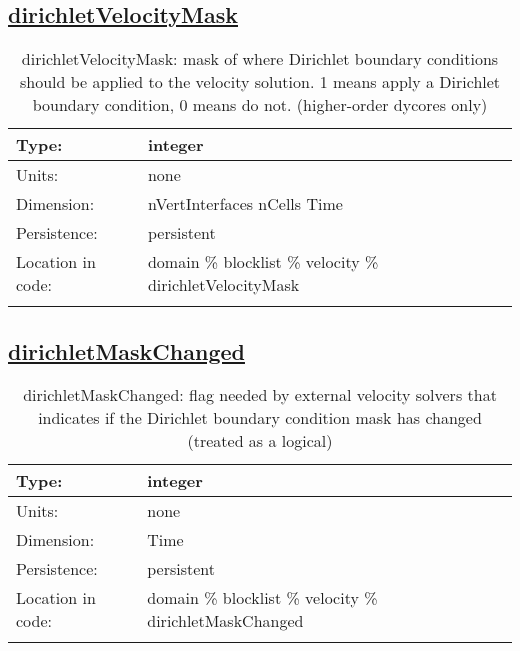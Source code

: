 \subsection[dirichletVelocityMask]{\hyperref[sec:var_tab_velocity]{dirichletVelocityMask}}
\label{subsec:var_sec_velocity_dirichletVelocityMask}
\begin{center}
\begin{longtable}{| p{2.0in} | p{4.0in} |}
        \hline 
        Type: & integer \\
        \hline 
        Units: & \si{none} \\
        \hline 
        Dimension: & nVertInterfaces nCells Time \\
        \hline 
        Persistence: & persistent \\
        \hline 
         Location in code: & domain \% blocklist \% velocity \% dirichletVelocityMask \\
         \hline 
    \caption{dirichletVelocityMask: mask of where Dirichlet boundary conditions should be applied to the velocity solution.  1 means apply a Dirichlet boundary condition, 0 means do not. (higher-order dycores only)}
\end{longtable}
\end{center}
\subsection[dirichletMaskChanged]{\hyperref[sec:var_tab_velocity]{dirichletMaskChanged}}
\label{subsec:var_sec_velocity_dirichletMaskChanged}
\begin{center}
\begin{longtable}{| p{2.0in} | p{4.0in} |}
        \hline 
        Type: & integer \\
        \hline 
        Units: & \si{none} \\
        \hline 
        Dimension: & Time \\
        \hline 
        Persistence: & persistent \\
        \hline 
         Location in code: & domain \% blocklist \% velocity \% dirichletMaskChanged \\
         \hline 
    \caption{dirichletMaskChanged: flag needed by external velocity solvers that indicates if the Dirichlet boundary condition mask has changed (treated as a logical)}
\end{longtable}
\end{center}
